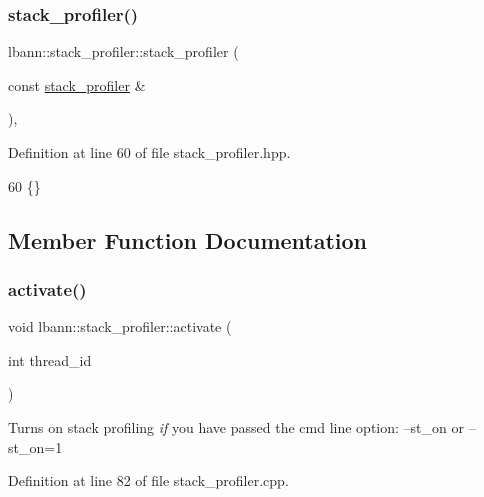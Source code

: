 \subsubsection{\texorpdfstring{stack\+\_\+profiler()}{stack\_profiler()}\hspace{0.1cm}{\footnotesize\ttfamily [2/2]}}
{\footnotesize\ttfamily lbann\+::stack\+\_\+profiler\+::stack\+\_\+profiler (\begin{DoxyParamCaption}\item[{const \hyperlink{classlbann_1_1stack__profiler}{stack\+\_\+profiler} \&}]{ }\end{DoxyParamCaption})\hspace{0.3cm}{\ttfamily [inline]}, {\ttfamily [private]}}



Definition at line 60 of file stack\+\_\+profiler.\+hpp.


\begin{DoxyCode}
60 \{\}
\end{DoxyCode}


\subsection{Member Function Documentation}
\mbox{\label{classlbann_1_1stack__profiler_a5c8e2ec1f36d36ff8211ec8910063777}} 
\subsubsection{\texorpdfstring{activate()}{activate()}}
{\footnotesize\ttfamily void lbann\+::stack\+\_\+profiler\+::activate (\begin{DoxyParamCaption}\item[{int}]{thread\+\_\+id }\end{DoxyParamCaption})}

Turns on stack profiling {\itshape if} you have passed the cmd line option\+: --st\+\_\+on or --st\+\_\+on=1 

Definition at line 82 of file stack\+\_\+profiler.\+cpp.


